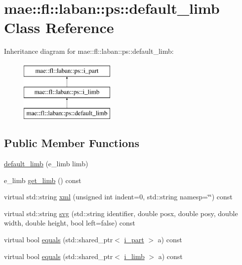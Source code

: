 \hypertarget{classmae_1_1fl_1_1laban_1_1ps_1_1default__limb}{\section{mae\-:\-:fl\-:\-:laban\-:\-:ps\-:\-:default\-\_\-limb Class Reference}
\label{classmae_1_1fl_1_1laban_1_1ps_1_1default__limb}
}
Inheritance diagram for mae\-:\-:fl\-:\-:laban\-:\-:ps\-:\-:default\-\_\-limb\-:\begin{figure}[H]
\begin{center}
\leavevmode
\includegraphics[height=3.000000cm]{classmae_1_1fl_1_1laban_1_1ps_1_1default__limb}
\end{center}
\end{figure}
\subsection*{Public Member Functions}
\begin{DoxyCompactItemize}
\item 
\hyperlink{classmae_1_1fl_1_1laban_1_1ps_1_1default__limb_ab153557aeb75d84a53698d10d4f5d883}{default\-\_\-limb} (e\-\_\-limb limb)
\item 
e\-\_\-limb \hyperlink{classmae_1_1fl_1_1laban_1_1ps_1_1default__limb_af92de65ffbed57d31534e3316baf0e91}{get\-\_\-limb} () const 
\item 
virtual std\-::string \hyperlink{classmae_1_1fl_1_1laban_1_1ps_1_1default__limb_a1d266ba068ce557431a90476b0ce3a82}{xml} (unsigned int indent=0, std\-::string namesp=\char`\"{}\char`\"{}) const 
\item 
virtual std\-::string \hyperlink{classmae_1_1fl_1_1laban_1_1ps_1_1default__limb_a489743d2be319dec0e05049b3c09db1e}{svg} (std\-::string identifier, double posx, double posy, double width, double height, bool left=false) const 
\item 
virtual bool \hyperlink{classmae_1_1fl_1_1laban_1_1ps_1_1default__limb_a9bdae13195e31e15c5511dcf04786aae}{equals} (std\-::shared\-\_\-ptr$<$ \hyperlink{classmae_1_1fl_1_1laban_1_1ps_1_1i__part}{i\-\_\-part} $>$ a) const 
\item 
virtual bool \hyperlink{classmae_1_1fl_1_1laban_1_1ps_1_1default__limb_ae7d58fdb145ee8c34b6f221ac0752b01}{equals} (std\-::shared\-\_\-ptr$<$ \hyperlink{classmae_1_1fl_1_1laban_1_1ps_1_1i__limb}{i\-\_\-limb} $>$ a) const 
\end{DoxyCompactItemize}


